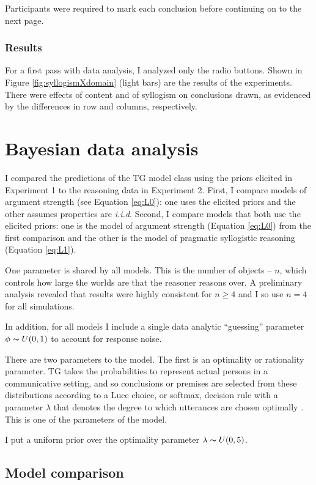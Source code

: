 \documentclass{llncs} %
\begin{document}
Participants were required to mark each conclusion before continuing on to the next page.

\subsubsection{Results}

For a first pass with data analysis, I analyzed only the radio buttons. Shown in Figure \ref{fig:syllogismXdomain} (light bars) are the results of the experiments. There were effects of content and of syllogism on conclusions drawn, as evidenced by the differences in row and columns, respectively.

\section{Bayesian data analysis}

I compared the predictions of the TG model class using the priors elicited in Experiment 1 to the reasoning data in Experiment 2.  First, I compare models of argument strength (see Equation \ref{eq:L0}): one uses the elicited priors and the other assumes properties are \emph{i.i.d}. Second, I compare models that both use the elicited priors: one is the model of argument strength (Equation \ref{eq:L0}) from the first comparison and the other is the model of pragmatic syllogistic reasoning (Equation \ref{eq:L1}).

One parameter is shared by all models. This is the number of objects -- $n$, which controls how large the worlds are that the reasoner reasons over. A preliminary analysis revealed that results were highly consistent for $n \geq 4$ and I so use $n=4$ for all simulations.  

In addition, for all models I include a single data analytic ``guessing'' parameter $\phi \thicksim U(0,1)$ to account for response noise.

There are two parameters to the model. The first is an optimality or rationality parameter. TG takes the probabilities to represent actual persons in a communicative setting, and so conclusions or premises are selected from these distributions according to a Luce choice, or softmax, decision rule with a parameter $\lambda$ that denotes the degree to which utterances are chosen optimally \cite{Luce1959}. This is one of the parameters of the model. 

I put a uniform prior over the optimality parameter $\lambda \thicksim U(0,5)$.

\subsection{Model comparison}
\end{document}
